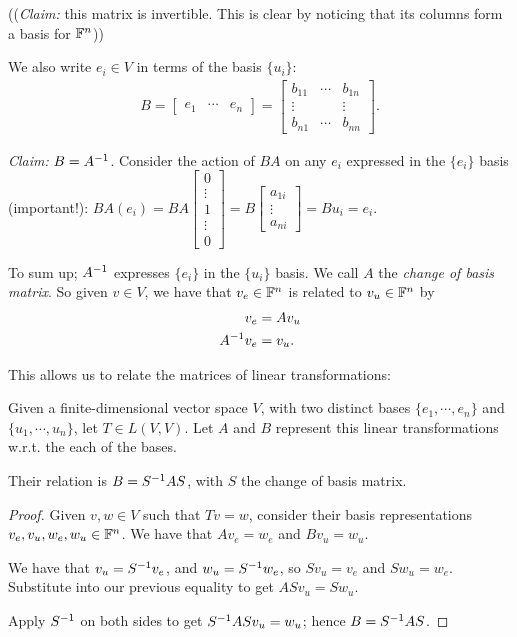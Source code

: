 ((\emph{Claim:} this matrix is invertible. This is clear by noticing that its columns form a basis for $\mathbb{F}^n$))

We also write $e_i\in V$ in terms of the basis $\{u_i\}$:
\begin{align*}
B = \begin{bmatrix}
  e_1 & \cdots & e_n
\end{bmatrix} =
\begin{bmatrix}
  b_{11} & \cdots & b_{1n}\\
  \vdots & & \vdots\\
  b_{n1} & \cdots & b_{nn}
\end{bmatrix}.
\end{align*}

\emph{Claim:} $B=A^{-1}$. Consider the action of $BA$ on any $e_i$ expressed in the $\{e_i\}$ basis (important!):
$BA(e_i)=BA\begin{bmatrix}0\\ \vdots \\ 1 \\\vdots \\ 0\end{bmatrix}
= B\begin{bmatrix}a_{1i} \\ \vdots \\ a_{ni}\end{bmatrix}
= B u_i
= e_i$.

To sum up; $A^{-1}$ expresses $\{e_i\}$ in the $\{u_i\}$ basis. We call $A$ the \emph{change of basis matrix}. So given $v\in V$, we have that $v_e\in\mathbb{F}^n$ is related to $v_u\in\mathbb{F}^n$ by
\begin{align*}
  v_e &= Av_u\\
  A^{-1} v_e &= v_u.
\end{align*}

This allows us to relate the matrices of linear transformations:

\begin{theorem}
  Given a finite-dimensional vector space $V$, with two distinct bases $\{e_1,\cdots,e_n\}$ and $\{u_1,\cdots,u_n\}$, let $T\in L(V,V)$. Let $A$ and $B$ represent this linear transformations w.r.t. the each of the bases.

  Their relation is $B=S^{-1} A S$, with $S$ the change of basis matrix.
\end{theorem}
\begin{proof}
  Given $v,w\in V$ such that $Tv=w$, consider their basis representations $v_e,v_u,w_e,w_u\in\mathbb{F}^n$. We have that $Av_e=w_e$ and $Bv_u=w_u$.

  We have that $v_u=S^{-1} v_e$, and $w_u=S^{-1} w_e$, so $Sv_u = v_e$ and $Sw_u=w_e$. Substitute into our previous equality to get $ASv_u=Sw_u$.

  Apply $S^{-1}$ on both sides to get $S^{-1} ASv_u = w_u$; hence $B=S^{-1} AS$.
\end{proof}

